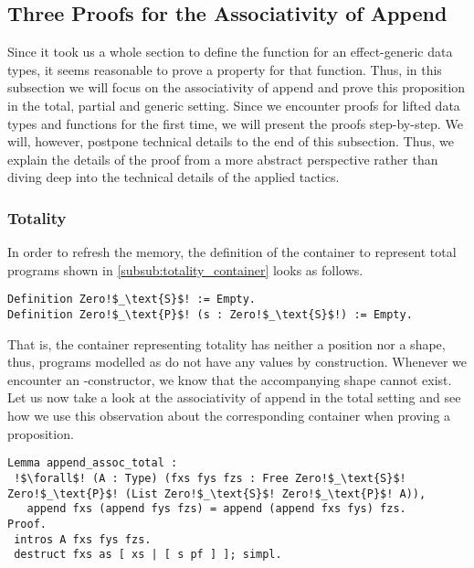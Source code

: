 \subsection{Three Proofs for the Associativity of Append}

Since it took us a whole section to define the function  for an effect\--generic  data types, it seems reasonable to prove a property for that function.
Thus, in this subsection we will focus on the associativity of append and prove this proposition in the total, partial and generic setting.
Since we encounter proofs for lifted data types and functions for the first time, we will present the proofs step\--by\--step.
We will, however, postpone technical details to the end of this subsection.
Thus, we explain the details of the proof from a more abstract perspective rather than diving deep into the technical details of the applied tactics.

\subsubsection{Totality}
In order to refresh the memory, the definition of the container to represent total programs shown in \autoref{subsub:totality_container} looks as follows.

\begin{verbatim}
Definition Zero!$_\text{S}$! := Empty.
Definition Zero!$_\text{P}$! (s : Zero!$_\text{S}$!) := Empty.
\end{verbatim}

That is, the container representing totality has neither a position nor a shape, thus, programs modelled as  do not have any  values by construction.
Whenever we encounter an \--constructor, we know that the accompanying shape  cannot exist.
Let us now take a look at the associativity of append in the total setting and see how we use this observation about the corresponding container when proving a proposition.

\begin{verbatim}
Lemma append_assoc_total :
 !$\forall$! (A : Type) (fxs fys fzs : Free Zero!$_\text{S}$! Zero!$_\text{P}$! (List Zero!$_\text{S}$! Zero!$_\text{P}$! A)),
   append fxs (append fys fzs) = append (append fxs fys) fzs.
Proof.
 intros A fxs fys fzs.
 destruct fxs as [ xs | [ s pf ] ]; simpl.
\end{verbatim}

